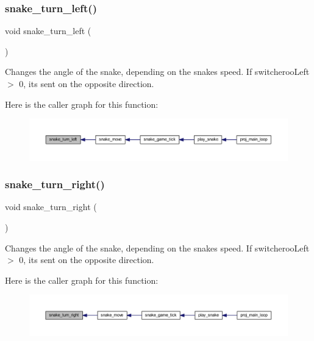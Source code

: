 \subsubsection{\texorpdfstring{snake\+\_\+turn\+\_\+left()}{snake\_turn\_left()}}
{\footnotesize\ttfamily void snake\+\_\+turn\+\_\+left (\begin{DoxyParamCaption}{ }\end{DoxyParamCaption})}



Changes the angle of the snake, depending on the snake\textquotesingle{}s speed. If switcheroo\+Left $>$ 0, it\textquotesingle{}s sent on the opposite direction. 

Here is the caller graph for this function\+:\nopagebreak
\begin{figure}[H]
\begin{center}
\leavevmode
\includegraphics[width=350pt]{group__snake_ga170531808ef1c4ac7d2481cd4278da99_icgraph}
\end{center}
\end{figure}
\mbox{\label{group__snake_ga9e40ed1a994c3ddde19f5e841d811116}} 
\subsubsection{\texorpdfstring{snake\+\_\+turn\+\_\+right()}{snake\_turn\_right()}}
{\footnotesize\ttfamily void snake\+\_\+turn\+\_\+right (\begin{DoxyParamCaption}{ }\end{DoxyParamCaption})}



Changes the angle of the snake, depending on the snake\textquotesingle{}s speed. If switcheroo\+Left $>$ 0, it\textquotesingle{}s sent on the opposite direction. 

Here is the caller graph for this function\+:\nopagebreak
\begin{figure}[H]
\begin{center}
\leavevmode
\includegraphics[width=350pt]{group__snake_ga9e40ed1a994c3ddde19f5e841d811116_icgraph}
\end{center}
\end{figure}
\mbox{\label{group__snake_ga51b55e1ad05667d456ed81db42c26b9f}} 
